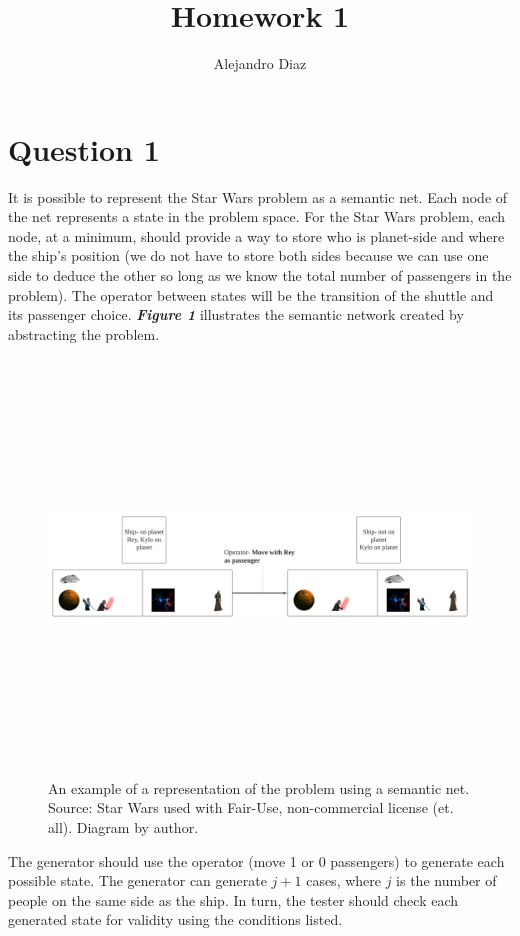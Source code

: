 \documentclass[
	letterpaper, %
]{jdf}
\author{Alejandro Diaz}
\title{Homework 1}
\begin{document}

\maketitle

\section{Question 1}
It is possible to represent the Star Wars problem as a semantic net. Each node of the net represents a state in the problem space. For the Star Wars problem, each node, at a minimum, should provide a way to store who is planet-side and where the ship's position (we do not have to store both sides because we can use one side to deduce the other so long as we know the total number of passengers in the problem). The operator between states will be the transition of the shuttle and its passenger choice. \textbf{\textit{Figure 1}} illustrates the semantic network created by abstracting the problem. 

\begin{figure}[h]
	\centering
	\includegraphics[height=11cm]{Figures/HW1 diagram - Page 2 (4).png}
	\caption{An example of a representation of the problem using a semantic net. Source: Star Wars used with Fair-Use, non-commercial  license (\cite{pngegg_contributor_star_nodate}et. all). Diagram by author.}
	\label{fig1:net}
\end{figure}

The generator should use the operator (move 1 or 0 passengers) to generate each possible state. The generator can generate $\textit{j} + 1$ cases, where $\textit{j}$ is the number of people on the same side as the ship. In turn, the tester should check each generated state for validity using the conditions listed.
\end{document}
